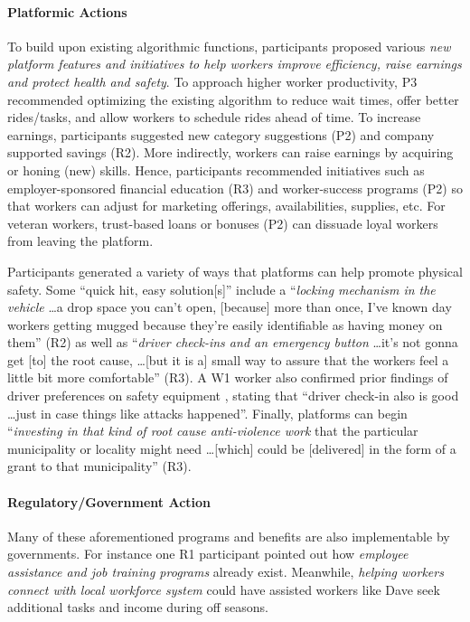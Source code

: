 \paragraph{Platformic Actions}
To build upon existing algorithmic functions, participants proposed various \textit{new platform features and initiatives to help workers improve efficiency, raise earnings and protect health and safety}.
To approach higher worker productivity, P3 recommended optimizing the existing algorithm to reduce wait times, offer better rides/tasks, and allow workers to schedule rides ahead of time. 
To increase earnings, participants suggested new category suggestions (P2) and company supported savings (R2).
More indirectly, workers can raise earnings by acquiring or honing (new) skills. Hence, participants recommended initiatives such as employer-sponsored financial education (R3) and worker-success programs (P2) so that workers can adjust for marketing offerings, availabilities, supplies, etc. For veteran workers, trust-based loans or bonuses (P2) can dissuade loyal workers from leaving the platform. 

Participants generated a variety of ways that platforms can help promote physical safety. Some ``quick hit, easy solution[s]'' include a ``\textit{locking mechanism in the vehicle} \dots a drop space you can't open, [because] more than once, I've known day workers getting mugged because they're easily identifiable as having money on them'' (R2) as well as  ``\textit{driver check-ins and an emergency button} \dots it's not gonna get [to] the root cause, \dots [but it is a] small way to assure that the workers feel a little bit more comfortable'' (R3). A W1 worker also confirmed  prior findings of driver preferences on safety equipment \cite{jbho}, stating that ``driver check-in also is good  \dots just in case things like attacks happened''. Finally, platforms can begin ``\textit{investing in that kind of root cause anti-violence work} that the particular municipality or locality might need \dots [which] could be [delivered] in the form of a grant to that municipality'' (R3). 

\paragraph{Regulatory/Government Action}
Many of these aforementioned programs and benefits are also implementable by governments. For instance one R1 participant pointed out how \textit{employee assistance and job training programs} already exist. Meanwhile, \textit{helping workers connect with local workforce system} could have assisted workers like Dave seek additional tasks and income during off seasons.


